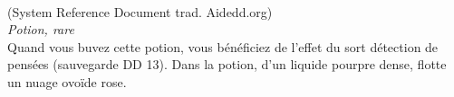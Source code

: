 \\
{\small (System Reference Document trad. Aidedd.org)}\\
{\small \it Potion, rare}\\
Quand vous buvez cette potion, vous bénéficiez de l'effet du sort détection de pensées (sauvegarde DD 13). Dans la potion, d'un liquide pourpre dense, flotte un nuage ovoïde rose. \\

